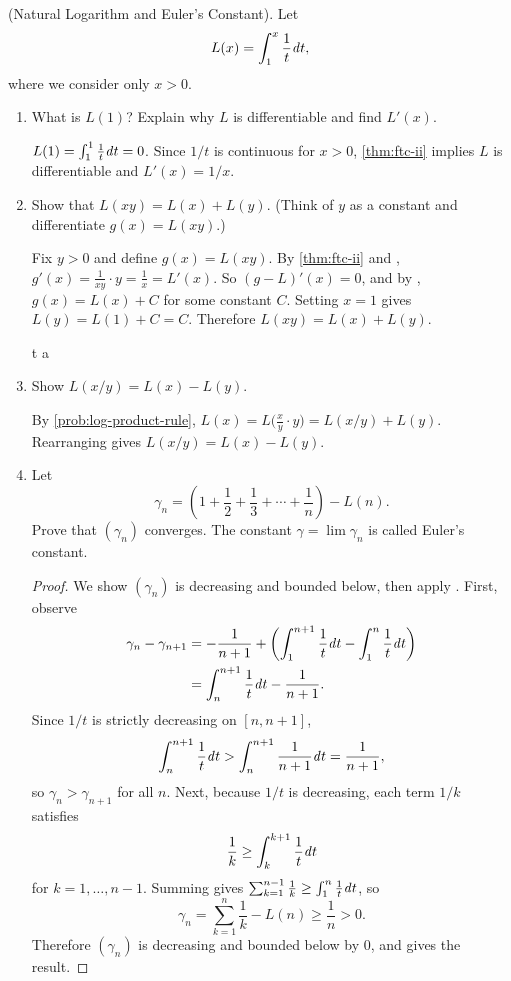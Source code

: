 \begin{problem}
  \label{prob:natural-log-euler}
  (Natural Logarithm and Euler's Constant). Let
  \[
    L(x) = \int_{1}^{x} \frac{1}{t} \mathit{d} t,
  \]
  where we consider only $x > 0$.
  \begin{enumerate}[label=(\alph*)]
    \item What is $L(1)$? Explain why $L$ is differentiable and find $L'(x)$.

      $L(1) = \int_{1}^{1} \frac{1}{t} \mathit{d} t = 0$. Since $1/t$ is continuous for $x > 0$,
      \ref{thm:ftc-ii} implies $L$ is differentiable and $L'(x) = 1/x$.

    \item Show that $L(xy) = L(x) + L(y)$. (Think of $y$ as a constant and
      differentiate $g(x) = L(xy)$.) \label{prob:log-product-rule}

      Fix $y > 0$ and define $g(x) = L(xy)$. By \ref{thm:ftc-ii} and
      , $g'(x) = \frac{1}{xy} \cdot y = \frac{1}{x} = L'(x)$. So $(g - L)'(x) = 0$, and
      by , $g(x) = L(x) + C$ for some constant $C$. Setting
      $x = 1$ gives $L(y) = L(1) + C = C$. Therefore $L(xy) = L(x) + L(y)$.

t a    \item Show $L(x/y) = L(x) - L(y)$.

      By \ref{prob:log-product-rule}, $L(x) = L\bigl(\frac{x}{y} \cdot y\bigr) = L(x/y) + L(y)$.
      Rearranging gives $L(x/y) = L(x) - L(y)$.

    \item Let
      \[
        \gamma_{n} = \left( 1 + \frac{1}{2} + \frac{1}{3} + \cdots + \frac{1}{n} \right) - L(n).
      \]
      Prove that $(\gamma_{n})$ converges. The constant $\gamma = \lim \gamma_{n}$ is called
      Euler's constant.

      \begin{proof}
        We show $(\gamma_{n})$ is decreasing and bounded below, then apply
        . First, observe
        \begin{align*}
          \gamma_{n} - \gamma_{n+1}
            &= -\frac{1}{n+1} + \left( \int_{1}^{n+1} \frac{1}{t} \mathit{d} t - \int_{1}^{n} \frac{1}{t} \mathit{d} t \right) \\
            &= \int_{n}^{n+1} \frac{1}{t} \mathit{d} t - \frac{1}{n+1}.
        \end{align*}
        Since $1/t$ is strictly decreasing on $[n, n+1]$,
        \[
          \int_{n}^{n+1} \frac{1}{t} \mathit{d} t > \int_{n}^{n+1} \frac{1}{n+1} \mathit{d} t = \frac{1}{n+1},
        \]
        so $\gamma_{n} > \gamma_{n+1}$ for all $n$. Next, because $1/t$ is decreasing,
        each term $1/k$ satisfies
        \[
          \frac{1}{k} \geq \int_{k}^{k+1} \frac{1}{t} \mathit{d} t
        \]
        for $k = 1, \ldots, n-1$. Summing gives
        $\sum_{k=1}^{n-1} \frac{1}{k} \geq \int_{1}^{n} \frac{1}{t} \mathit{d} t$, so
        \[
          \gamma_{n} = \sum_{k=1}^{n} \frac{1}{k} - L(n) \geq \frac{1}{n} > 0.
        \]
        Therefore $(\gamma_{n})$ is decreasing and bounded below by $0$, and
         gives the result.
      \end{proof}


\end{enumerate}
\end{problem}
